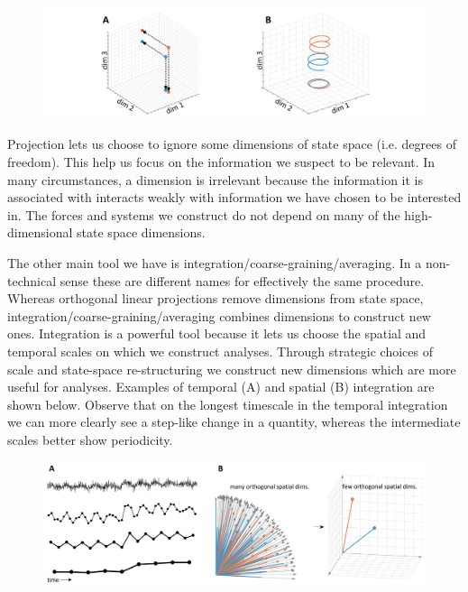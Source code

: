   
\begin{figure}
\includegraphics[width=\textwidth]{figures/Tilsen-img170.png}
\caption{\missingcaption}
\label{fig:}
\end{figure}
 

  Projection lets us choose to ignore some dimensions of state space (i.e. degrees of freedom). This help us focus on the information we suspect to be relevant. In many circumstances, a dimension is irrelevant because the information it is associated with interacts weakly with information we have chosen to be interested in. The forces and systems we construct do not depend on many of the high-dimensional state space dimensions. 

  The other main tool we have is integration/coarse-graining/averaging. In a non-technical sense these are different names for effectively the same procedure. Whereas orthogonal linear projections remove dimensions from state space, integration/coarse-graining/averaging combines dimensions to construct new ones. Integration is a powerful tool because it lets us choose the spatial and temporal scales on which we construct analyses. Through strategic choices of scale and state-space re-structuring we construct new dimensions which are more useful for analyses. Examples of temporal (A) and spatial (B) integration are shown below. Observe that on the longest timescale in the temporal integration we can more clearly see a step-like change in a quantity, whereas the intermediate scales better show periodicity.

  
\begin{figure}
\includegraphics[width=\textwidth]{figures/Tilsen-img171.png}
\caption{\missingcaption}
\label{fig:}
\end{figure}
 


